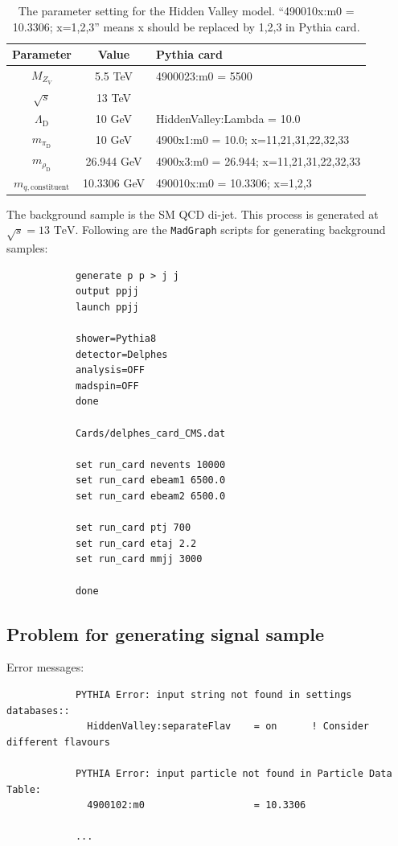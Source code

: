 \documentclass[12pt]{article}
\begin{document}
		\begin{table}[htpb]
			\centering
			\caption{The parameter setting for the Hidden Valley model. ``490010x:m0 = 10.3306; x=1,2,3'' means x should be replaced by 1,2,3 in Pythia card.}
			\label{tab:hv_model_signal_parameter}
			\begin{tabular}{c|c|l}
				Parameter                  & Value       & Pythia card                             \\ \hline
				$M_{Z_V}$                  & 5.5 TeV     & 4900023:m0 = 5500                       \\
				$\sqrt{s}$                 & 13 TeV      &                                         \\
				$\Lambda_{\text{D}}$       & 10 GeV      & HiddenValley:Lambda = 10.0              \\
				$m_{\pi_{\text{D}}}$       & 10 GeV      & 4900x1:m0 = 10.0; x=11,21,31,22,32,33   \\
				$m_{\rho_{\text{D}}}$      & 26.944 GeV  & 4900x3:m0 = 26.944; x=11,21,31,22,32,33 \\
				$m_{q,\text{constituent}}$ & 10.3306 GeV & 490010x:m0 = 10.3306; x=1,2,3          
			\end{tabular}
		\end{table}

		The background sample is the SM QCD di-jet. This process is generated at $\sqrt{s} = \text{13 TeV}$. Following are the \verb|MadGraph| scripts for generating background samples:	
		\begin{verbatim}
			generate p p > j j
			output ppjj
			launch ppjj

			shower=Pythia8
			detector=Delphes
			analysis=OFF
			madspin=OFF
			done

			Cards/delphes_card_CMS.dat

			set run_card nevents 10000
			set run_card ebeam1 6500.0
			set run_card ebeam2 6500.0

			set run_card ptj 700
			set run_card etaj 2.2
			set run_card mmjj 3000

			done	
		\end{verbatim}
	\subsection{Problem for generating signal sample}%
	\label{sub:problem_for_generating_signal_sample}
		Error messages:
		\begin{verbatim}
			PYTHIA Error: input string not found in settings databases::
			  HiddenValley:separateFlav    = on      ! Consider different flavours

			PYTHIA Error: input particle not found in Particle Data Table:
			  4900102:m0                   = 10.3306

			...
		\end{verbatim}
\end{document}
